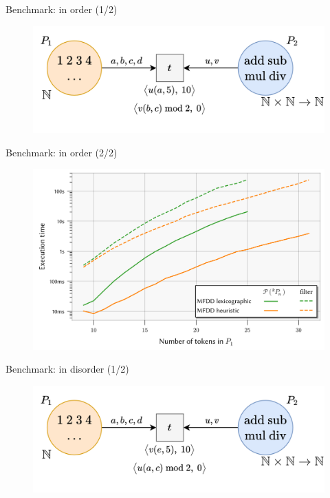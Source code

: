 \documentclass[10pt]{beamer}
\begin{document}
\begin{frame}[fragile]{Benchmark: in order (1/2)}
    \begin{figure}
        \centering
        \includegraphics[width=1.0\textwidth]{5v.png}
    \end{figure}
\end{frame}

\begin{frame}[fragile]{Benchmark: in order (2/2)}
    \begin{figure}
        \centering
        \includegraphics[width=1.0\textwidth]{bench5v.png}
    \end{figure}
\end{frame}

\begin{frame}[fragile]{Benchmark: in disorder (1/2)}
    \begin{figure}
        \centering
        \includegraphics[width=1.0\textwidth]{5v2.png}
    \end{figure}
\end{frame}
\end{document}
